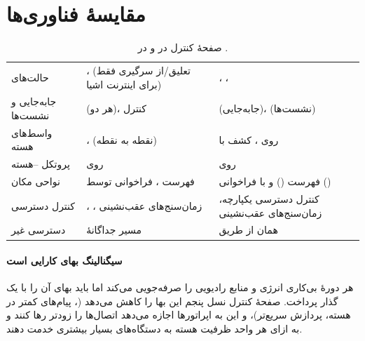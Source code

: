 \documentclass[11pt,a4paper]{article}
\begin{document}
\section{مقایسهٔ فناوری‌ها}
\begin{table}[htbp]
\centering\small
\caption{صفحهٔ کنترل در  و در .}\label{tab:cmp}
\begin{tabularx}{\linewidth}{@{}l Y Y@{}}
\toprule
{} &  &  \\
\midrule
حالت‌های    & ،  (تعلیق/از سرگیری فقط برای اینترنت اشیا) & ، ،  \\
جابه‌جایی و نشست‌ها   &  (هر دو)، کنترل  &  (جابه‌جایی)،  (نشست‌ها) \\
واسط‌های هسته        & ،  (نقطه به نقطه) &  روی ، کشف با  \\
پروتکل --هسته &  روی  &  روی  \\
نواحی مکان           & فهرست ، فراخوانی توسط  & فهرست  () و  با فراخوانی  () \\
کنترل دسترسی         & ، ، زمان‌سنج‌های عقب‌نشینی & کنترل دسترسی یکپارچه، زمان‌سنج‌های عقب‌نشینی \\
دسترسی غیر   & مسیر جداگانهٔ  & همان  از طریق  \\
\bottomrule
\end{tabularx}
\end{table}

\paragraph{سیگنالینگ بهای کارایی است} هر دورهٔ بی‌کاری انرژی و منابع رادیویی را صرفه‌جویی می‌کند اما باید بهای آن را با یک گذار پرداخت. صفحهٔ کنترل
نسل پنجم این بها را کاهش می‌دهد (، پیام‌های کمتر در هسته، پردازش سریع‌تر)، و این به اپراتورها اجازه می‌دهد اتصال‌ها را زودتر رها کنند
و به ازای هر واحد ظرفیت هسته به دستگاه‌های بسیار بیشتری خدمت دهند.

\end{document}
